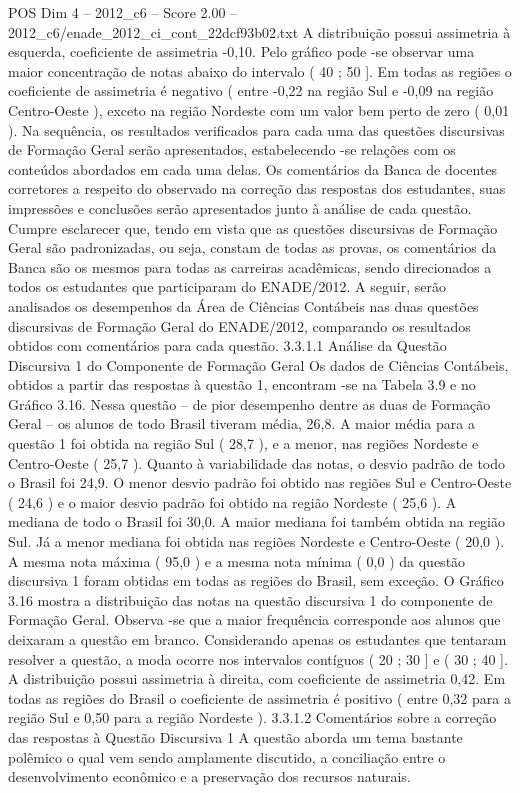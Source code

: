 \begin{textsample}{POS Dim 4 – 2012\_c6 – Score 2.00 – 2012\_c6/enade\_2012\_ci\_cont\_22dcf93b02.txt}
A distribuição possui assimetria à esquerda, coeficiente de assimetria -0,10.
Pelo gráfico pode -se observar uma maior concentração de notas abaixo do intervalo ( 40 ; 50 ].
Em todas as regiões o coeficiente de assimetria é negativo ( entre -0,22 na região Sul e -0,09 na região Centro-Oeste ), exceto na região Nordeste com um valor bem perto de zero ( 0,01 ).
Na sequência, os resultados verificados para cada uma das questões discursivas de Formação Geral serão apresentados, estabelecendo -se relações com os conteúdos abordados em cada uma delas.
Os comentários da Banca de docentes corretores a respeito do observado na correção das respostas dos estudantes, suas impressões e conclusões serão apresentados junto à análise de cada questão.
Cumpre esclarecer que, tendo em vista que as questões discursivas de Formação Geral são padronizadas, ou seja, constam de todas as provas, os comentários da Banca são os mesmos para todas as carreiras acadêmicas, sendo direcionados a todos os estudantes que participaram do ENADE/2012.
A seguir, serão analisados os desempenhos da Área de Ciências Contábeis nas duas questões discursivas de Formação Geral do ENADE/2012, comparando os resultados obtidos com comentários para cada questão. 3.3.1.1 Análise da Questão Discursiva 1 do Componente de Formação Geral Os dados de Ciências Contábeis, obtidos a partir das respostas à questão 1, encontram -se na Tabela 3.9 e no Gráfico 3.16.
Nessa questão – de pior desempenho dentre as duas de Formação Geral – os alunos de todo Brasil tiveram média, 26,8.
A maior média para a questão 1 foi obtida na região Sul ( 28,7 ), e a menor, nas regiões Nordeste e Centro-Oeste ( 25,7 ).
Quanto à variabilidade das notas, o desvio padrão de todo o Brasil foi 24,9.
O menor desvio padrão foi obtido nas regiões Sul e Centro-Oeste ( 24,6 ) e o maior desvio padrão foi obtido na região Nordeste ( 25,6 ).
A mediana de todo o Brasil foi 30,0.
A maior mediana foi também obtida na região Sul.
Já a menor mediana foi obtida nas regiões Nordeste e Centro-Oeste ( 20,0 ).
A mesma nota máxima ( 95,0 ) e a mesma nota mínima ( 0,0 ) da questão discursiva 1 foram obtidas em todas as regiões do Brasil, sem exceção.
O Gráfico 3.16 mostra a distribuição das notas na questão discursiva 1 do componente de Formação Geral.
Observa -se que a maior frequência corresponde aos alunos que deixaram a questão em branco.
Considerando apenas os estudantes que tentaram resolver a questão, a moda ocorre nos intervalos contíguos ( 20 ; 30 ] e ( 30 ; 40 ].
A distribuição possui assimetria à direita, com coeficiente de assimetria 0,42.
Em todas as regiões do Brasil o coeficiente de assimetria é positivo ( entre 0,32 para a região Sul e 0,50 para a região Nordeste ). 3.3.1.2 Comentários sobre a correção das respostas à Questão Discursiva 1 A questão aborda um tema bastante polêmico o qual vem sendo amplamente discutido, a conciliação entre o desenvolvimento econômico e a preservação dos recursos naturais.

\end{textsample}
